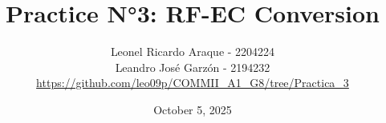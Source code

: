 \documentclass{journal}[IEEEtran, twocolumn]             %
\newcommand{\dochead}{Practice N°3}
\newcommand{\docsubhead}{RF-EC Conversion}
\newcommand{\titulo}{\dochead: \docsubhead}
\newcommand{\fecha}{October 5, 2025}
\begin{document}

\title{\textbf{\titulo}}            %

\author{
Leonel Ricardo Araque - 2204224 \\
Leandro José Garzón - 2194232 \\
\href{https://github.com/leo09p/COMMII_A1_G8/tree/Practica_3}{https://github.com/leo09p/COMMII_A1_G8/tree/Practica_3}
}


\date{\fecha}                       %

\maketitle                          %
\thispagestyle{fancy}               %


\color{black}
\end{document}
